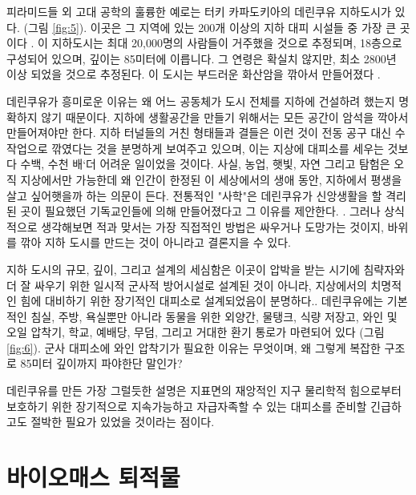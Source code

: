 \documentclass[10pt,twocolumn,letterpaper]{article}
\begin{document}
피라미드들 외 고대 공학의 훌륭한 예로는 터키 카파도키아의 데린쿠유 지하도시가 있다. (그림 \ref{fig:5}). 이곳은 그 지역에 있는 200개 이상의 지하 대피 시설들 중 가장 큰 곳이다 \cite{54}. 이 지하도시는 최대 20,000명의 사람들이 거주했을 것으로 추정되며, 18층으로 구성되어 있으며, 깊이는 85미터에 이릅니다. 그 연령은 확실치 않지만, 최소 2800년 이상 되었을 것으로 추정된다. 이 도시는 부드러운 화산암을 깎아서 만들어졌다 \cite{52, 53}.

데린쿠유가 흥미로운 이유는 왜 어느 공동체가 도시 전체를 지하에 건설하려 했는지 명확하지 않기 때문이다. 지하에 생활공간을 만들기 위해서는 모든 공간이 암석을 깍아서 만들어져야만 한다. 지하 터널들의 거친 형태들과 결들은 이런 것이 전동 공구 대신 수작업으로 깎였다는 것을 분명하게 보여주고 있으며, 이는 지상에 대피소를 세우는 것보다 수백, 수천 배`더 어려운 일이었을 것이다. 사실, 농업, 햇빛, 자연 그리고 탐험은 오직 지상에서만  가능한데 왜 인간이 한정된 이 세상에서의 생애 동안, 지하에서 평생을 살고 싶어햇을까 하는 의문이 든다. 전통적인 "사학"은 데린쿠유가 신앙생활을 할 격리된 곳이 필요했던 기독교인들에 의해 만들어졌다고 그 이유를 제안한다. \cite{53}. 그러나 상식적으로 생각해보면 적과 맞서는 가장 직접적인 방법은  싸우거나 도망가는 것이지, 바위를 깎아 지하 도시를 만드는 것이 아니라고 결론지을 수 있다.

지하 도시의 규모, 깊이, 그리고 설계의 세심함은 이곳이 압박을 받는 시기에
 침략자와 더 잘 싸우기 위한 일시적 군사적 방어시설로 설계된 것이 아니라, 지상에서의 치명적인 힘에 대비하기 위한 장기적인 대피소로 설계되었음이 분명하다.. 데린쿠유에는 기본적인 침실, 주방, 욕실뿐만 아니라 동물을 위한 외양간, 물탱크, 식량 저장고, 와인 및 오일 압착기, 학교, 예배당, 무덤, 그리고 거대한 환기 통로가 마련되어 있다 (그림 \ref{fig:6}). 군사 대피소에 와인 압착기가 필요한 이유는 무엇이며, 왜 그렇게 복잡한 구조로 85미터 깊이까지 파야한단 말인가?

데린쿠유를 만든 가장 그럴듯한 설명은 지표면의 재앙적인 지구 물리학적 힘으로부터 보호하기 위한 장기적으로 지속가능하고 자급자족할 수 있는 대피소를 준비할 긴급하고도 절박한 필요가 있었을 것이라는 점이다.

\section{바이오매스 퇴적물}
 
\end{document}
